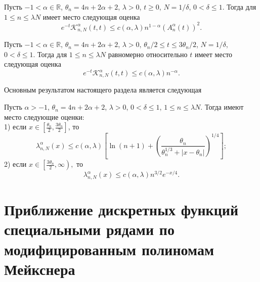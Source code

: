 \begin{lemma}
Пусть $-1<\alpha\in\mathbb{R}$, $\theta_n=4n+2\alpha+2$, $\lambda>0$, $t\geq0$, $N=1/\delta$, $0<\delta\leq1$. Тогда для $1\leq n\leq \lambda N$ имеет место следующая оценка
\begin{equation*}
e^{-t}\mathcal{ K}_{n,N}^\alpha(t,t)\le c(\alpha,\lambda)n^{1-\alpha}(A_n^\alpha(t))^2.
\end{equation*}
\end{lemma}

\begin{lemma}
Пусть $-1<\alpha\in\mathbb{R}$, $\theta_n=4n+2\alpha+2$, $\lambda>0$, $\theta_n/2\leq t\leq 3\theta_n/2$, $N=1/\delta$, $0<\delta\leq1$. Тогда для $1\leq n\leq \lambda N$ равномерно относительно $t$ имеет место следующая оценка
\begin{equation*}
e^{-t}\mathcal{ K}_{n,N}^\alpha(t,t)\le c(\alpha,\lambda)n^{-\alpha}.
\end{equation*}
\end{lemma}

Основным результатом настоящего раздела является следующая
\begin{theorem}\label{Ramtheo1}
Пусть $\alpha>-1$, $\theta_n=4n+2\alpha+2$, $\lambda>0$, $0<\delta\leq1$, $1\leq n\leq\lambda N.$ Тогда имеют место следующие оценки:\\
1) если $x\in \left[\frac{\theta_n}{2},\frac{3\theta_n}{2}\right]$, то
\begin{equation*}
\lambda_{n,N}^{\alpha}(x)\leq c(\alpha,\lambda)\left[\ln(n+1)+
\left(\frac{\theta_n}{\theta_n^{1/3}+|x-\theta_n|}\right)^{1/4}\right];
\end{equation*}
2) если $x\in \left[\frac{3\theta_n}{2},\infty\right),$ то
\begin{equation*}
\lambda_{n,N}^{\alpha}(x)\leq c(\alpha,\lambda)n^{3/2}e^{-x/4}.
\end{equation*}
\end{theorem}

\chapter{Приближение дискретных функций специальными рядами по модифицированным полиномам Мейкснера}

